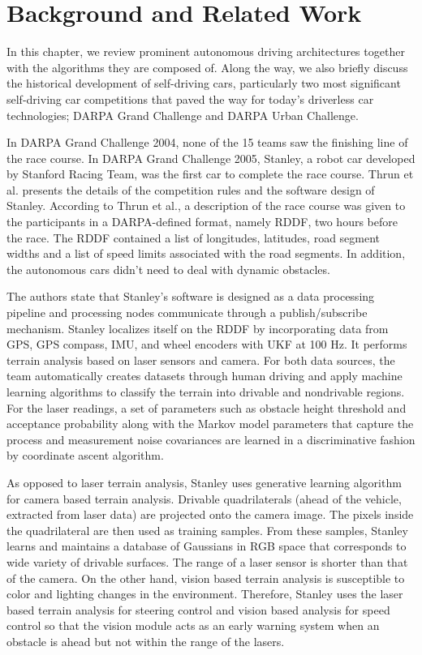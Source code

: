 \chapter{Background and Related Work}
\label{chp:b2}

In this chapter, we review prominent autonomous driving architectures together
with the algorithms they are composed of. Along the way, we also briefly
discuss the historical development of self-driving cars, particularly two most
significant self-driving car competitions that paved the way for today's
driverless car technologies; DARPA Grand Challenge and DARPA Urban Challenge.

In DARPA Grand Challenge 2004, none of the 15 teams saw the finishing line of
the race course. In DARPA Grand Challenge 2005, Stanley, a robot car developed
by Stanford Racing Team, was the first car to complete the race course. Thrun
et al. \cite{Thrun2006StanleyTR} presents the details of the competition rules
and the software design of Stanley. According to Thrun et al., a description of
the race course was given to the participants in a DARPA-defined format, namely
RDDF, two hours before the race. The RDDF contained a list of longitudes,
latitudes, road segment widths and a list of speed limits associated with the
road segments. In addition, the autonomous cars didn't need to deal with
dynamic obstacles.

The authors state that Stanley's software is designed as a data processing
pipeline and processing nodes communicate through a publish/subscribe
mechanism. Stanley localizes itself on the RDDF by incorporating data from GPS,
GPS compass, IMU, and wheel encoders with UKF at 100 Hz. It performs terrain
analysis based on laser sensors and camera. For both data sources, the team
automatically creates datasets through human driving and apply machine learning
algorithms to classify the terrain into drivable and nondrivable regions. For
the laser readings, a set of parameters such as obstacle height threshold and
acceptance probability along with the Markov model parameters that capture the
process and measurement noise covariances are learned in a discriminative
fashion by coordinate ascent algorithm.

As opposed to laser terrain analysis, Stanley uses generative learning
algorithm for camera based terrain analysis. Drivable quadrilaterals (ahead of
the vehicle, extracted from laser data) are projected onto the camera image.
The pixels inside the quadrilateral are then used as training samples. From
these samples, Stanley learns and maintains a database of Gaussians in RGB
space that corresponds to wide variety of drivable surfaces. The range of a
laser sensor is shorter than that of the camera. On the other hand, vision
based terrain analysis is susceptible to color and lighting changes in the
environment. Therefore, Stanley uses the laser based terrain analysis for
steering control and vision based analysis for speed control so that the vision
module acts as an early warning system when an obstacle is ahead but not within
the range of the lasers.

